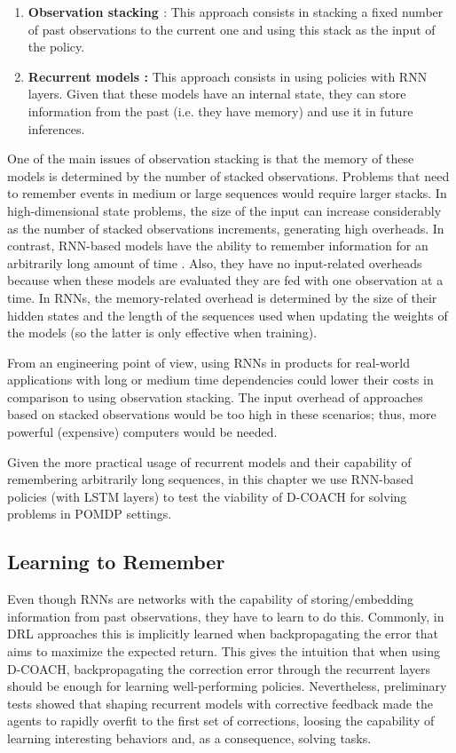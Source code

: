 \begin{enumerate}
    \item \textbf{Observation stacking \cite{atari}}: This approach consists in stacking a fixed number of past observations to the current one and using this stack as the input of the policy. 
    \item \textbf{Recurrent models \cite{hausknecht2015deep}:} This approach consists in using policies with RNN layers. Given that these models have an internal state, they can store information from the past (i.e. they have memory) and use it in future inferences. 
\end{enumerate}

One of the main issues of observation stacking is that the memory of these models is determined by the number of stacked observations. Problems that need to remember events in medium or large sequences would require larger stacks. In high-dimensional state problems, the size of the input can increase considerably as the number of stacked observations increments, generating high overheads. In contrast, RNN-based models have the ability to remember information for an arbitrarily long amount of time \cite{lample2017playing}.  Also, they have no input-related overheads because when these models are evaluated they are fed with one observation at a time. In RNNs, the memory-related overhead is determined by the size of their hidden states and the length of the sequences used when updating the weights of the models (so the latter is only effective when training).

From an engineering point of view, using RNNs in products for real-world applications with long or medium time dependencies could lower their costs in comparison to using observation stacking. The input overhead of approaches based on stacked observations would be too high in these scenarios; thus, more powerful (expensive) computers would be needed. 

Given the more practical usage of recurrent models and their capability of remembering arbitrarily long sequences, in this chapter we use RNN-based policies (with LSTM layers) to test the viability of D-COACH for solving problems in POMDP settings. 

\subsection{Learning to Remember}
Even though RNNs are networks with the capability of storing/embedding information from past observations, they have to learn to do this. Commonly, in DRL approaches this is implicitly learned when backpropagating the error that aims to maximize the expected return. This gives the intuition that when using D-COACH, backpropagating the correction error through the recurrent layers should be enough for learning well-performing policies. Nevertheless, preliminary tests showed that shaping recurrent models with corrective feedback made the agents to rapidly overfit to the first set of corrections, loosing the capability of learning interesting behaviors and, as a consequence, solving tasks. 

